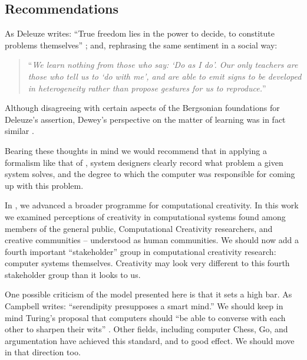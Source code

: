 \subsection{Recommendations} \label{sec:recommendations}


%
As Deleuze writes: ``True freedom lies in the power to decide, to
constitute problems themselves'' \cite[p. 15]{deleuze1991bergsonism};
and, rephrasing the same sentiment in a social way:
\begin{quote}
``\emph{We learn nothing from those who say: `Do as I do'. Our only teachers
  are those who tell us to `do with me', and are able to emit signs to
  be developed in heterogeneity rather than propose gestures for us to
  reproduce.}''~\cite[p. 26]{deleuze1994difference}
\end{quote}
Although disagreeing with certain aspects of the Bergsonian
foundations for Deleuze's assertion, Dewey's perspective on the matter
of learning was in fact similar \cite[p. 73]{dewey-by-mead}.

Bearing these thoughts in mind we would recommend that in applying a
formalism like that of \cite{colton-assessingprogress}, system
designers clearly record what problem a given system solves, and the
degree to which the computer was responsible for coming up with this
problem.

In \cite{stakeholder-groups-bookchapter}, we advanced a broader
programme for computational creativity.  In this work we examined
perceptions of creativity in computational systems found among members
of the general public, Computational Creativity researchers, and
creative communities -- understood as human communities.  We should
now add a fourth important ``stakeholder'' group in computational
creativity research: computer systems themselves.  Creativity may look
very different to this fourth stakeholder group than it looks to us.

One possible criticism of the model presented here is that it sets a
high bar.  As Campbell \citeyear{campbell} writes: ``serendipity
presupposes a smart mind.''  We should keep in mind Turing's proposal
that computers should ``be able to converse with each other to sharpen
their wits'' \cite{turing-intelligent}.  Other fields, including
computer Chess, Go, and argumentation have achieved this standard, and
to good effect.  We should move in that direction too.


